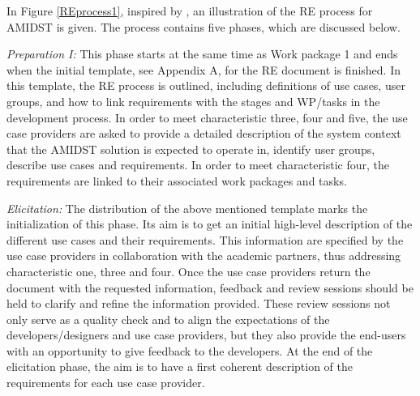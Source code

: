 In Figure \ref{REprocess1}, inspired by \cite{Ebe10}, an illustration of the RE process for AMIDST is given.  The process 
contains five phases, which are discussed below.

\emph{Preparation I:}  This phase starts at the same time as Work package 1 and ends when the initial template,
see Appendix A, for the RE document is finished.  In this template, the RE process
is outlined, including definitions of use cases, user groups, and how to link requirements with the stages and WP/tasks
in the development process.  In order to meet characteristic three, four and five, the use case providers are asked to
provide a detailed description of the system context that the AMIDST solution is expected to operate in, identify user
groups, describe use cases and requirements.  In order to meet characteristic four, the requirements are linked to their
associated work packages and tasks. 

\emph{Elicitation:} The distribution of the above mentioned template marks the initialization of this phase.  Its aim is
to get an initial high-level description of the different use cases and their requirements. This information are
specified by the use case providers in collaboration with the academic partners, thus addressing characteristic one,
three and four.  Once the use case providers return the document with the requested information, feedback and
review sessions should be held to clarify and refine the information provided. These review sessions not only serve as a
quality check and to align the expectations of the developers/designers and use case providers, but they also provide the 
end-users with an
opportunity to give feedback to the developers.  At the end of the elicitation phase, the
aim is to have a first coherent description of the requirements for each use case provider. 

